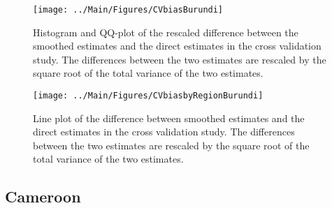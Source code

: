 \documentclass[12pt]{article}\usepackage[]{graphicx}\usepackage[]{color}
\newenvironment{knitrout}{}{} %
\begin{document}
\begin{knitrout}
\color{fgcolor}\begin{figure}[bht]

{\centering \texttt{[image: ../Main/Figures/CVbiasBurundi]} 

}

\caption[Histogram and QQ-plot of the rescaled difference between the smoothed estimates and the direct estimates in the cross validation study]{Histogram and QQ-plot of the rescaled difference between the smoothed estimates and the direct estimates in the cross validation study. The differences between the two estimates are rescaled by the square root of the total variance of the two estimates.}\label{fig:unnamed-chunk-39}
\end{figure}


\end{knitrout}

\begin{knitrout}
\color{fgcolor}\begin{figure}[bht]

{\centering \texttt{[image: ../Main/Figures/CVbiasbyRegionBurundi]} 

}

\caption[Line plot of the difference between smoothed estimates and the direct estimates in the cross validation study]{Line plot of the difference between smoothed estimates and the direct estimates in the cross validation study. The differences between the two estimates are rescaled by the square root of the total variance of the two estimates.}\label{fig:unnamed-chunk-40}
\end{figure}


\end{knitrout}

\clearpage
\subsection{Cameroon}


\end{document}
